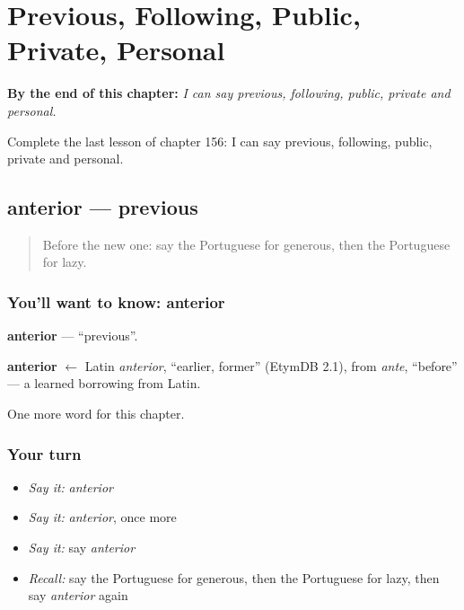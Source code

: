 
\chapter{Previous, Following, Public, Private, Personal}
\label{ch:pt-previous-following-public-private-personal}

\begin{chapteropening}
\textbf{By the end of this chapter:} \emph{I can say previous, following, public, private and personal.}

Complete the last lesson of chapter 156: I can say previous, following, public, private and personal.
\end{chapteropening}

\section[anterior]{anterior — previous}

\label{lesson:PT-C156-anterior}



\begin{quote}
Before the new one: say the Portuguese for generous, then the Portuguese for lazy.
\end{quote}

\subsection*{You'll want to know: anterior}
\textbf{anterior} — \textquotedblleft{}previous\textquotedblright{}.

\begin{cousinweb}
\textbf{anterior} $\leftarrow$ Latin \emph{anterior}, \textquotedblleft{}earlier, former\textquotedblright{} (EtymDB 2.1), from \emph{ante}, \textquotedblleft{}before\textquotedblright{} — a learned borrowing from Latin.
\end{cousinweb}

\begin{grammarlens}[title={What you've built}]
One more word for this chapter.
\end{grammarlens}

\subsection*{Your turn}
\begin{itemize}
\raggedright
  \item \emph{Say it:} \emph{anterior}
  \item \emph{Say it:} \emph{anterior}, once more
  \item \emph{Say it:} say \emph{anterior}
  \item \emph{Recall:} say the Portuguese for generous, then the Portuguese for lazy, then say \emph{anterior} again
\end{itemize}

